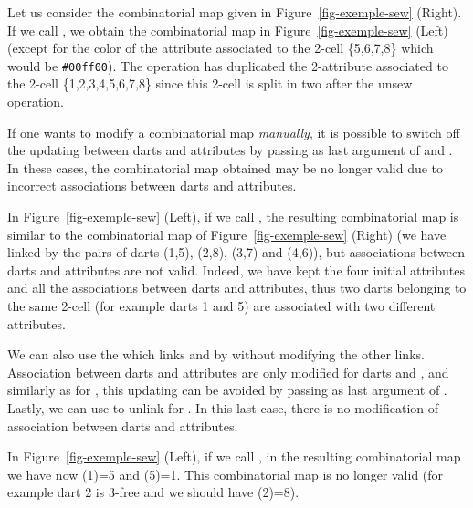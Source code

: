 Let us consider the combinatorial map given in
Figure~\ref{fig-exemple-sew} (Right). If we call , we
obtain the combinatorial map in Figure~\ref{fig-exemple-sew} (Left)
(except for the color of the attribute associated to the
2-cell \{5,6,7,8\} which would be \texttt{\#00ff00}).  The 
operation has duplicated the 2-attribute associated to the 2-cell
\{1,2,3,4,5,6,7,8\} since this 2-cell is split in two after the
unsew operation.

\begin{ccAdvanced}
  If one wants to modify a combinatorial map \emph{manually}, it is 
  possible to switch off the updating between
  darts and attributes by passing  as last argument of
   and
  .  In these cases, the
  combinatorial map obtained may be no longer valid due to incorrect
  associations between darts and attributes.
  
  In Figure~\ref{fig-exemple-sew} (Left), if we call
  , the resulting combinatorial map is similar
  to the combinatorial map of Figure~\ref{fig-exemple-sew} (Right)
  (we have linked by \betatrois{} the pairs of darts (1,5), (2,8),
  (3,7) and (4,6)), but associations between darts and attributes
  are not valid. Indeed, we have kept the four initial attributes
  and all the associations between darts and attributes, thus two
  darts belonging to the same 2-cell (for example darts 1 and 5) are
  associated with two different attributes.

  We can also use the
   which links
   and  by \betai{} without modifying the other
  links.
  Association between darts and attributes are only modified for darts
   and , and similarly as for , this
  updating can be avoided by passing  as last argument of
  .  Lastly, we can use
   to unlink  for \betai{}. In this
  last case, there is no modification of association between darts and
  attributes.

  In Figure~\ref{fig-exemple-sew} (Left), if we call
  , in the resulting combinatorial map we have
  now \betatrois{}(1)=5 and \betatrois{}(5)=1. This combinatorial map is no
  longer valid (for example dart 2 is 3-free and we should have
  \betatrois{}(2)=8).

\end{ccAdvanced}

